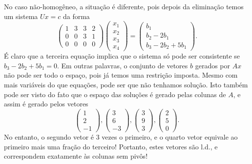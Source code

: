 No caso não-homogêneo, a situação é diferente, pois depois da eliminação temos um sistema $Ux=c$ da forma
\begin{equation*}
   \begin{pmatrix}
      1 & 3 & 3 & 2\\
      0 & 0 & 3 & 1\\
      0 & 0 & 0 & 0 
    \end{pmatrix}
    \begin{pmatrix}
      x_1\\
      x_2\\
      x_3\\
      x_4
    \end{pmatrix}
    =
    \begin{pmatrix}
      b_1\\
      b_2-2b_1\\
      b_3-2b_2+5b_1
    \end{pmatrix}.
\end{equation*}
É claro que a terceira equação implica que o sistema só pode ser consistente se $b_3-2b_2 +5b_1=0$. Em outras palavras, o conjunto de vetores $b$ gerados por $Ax$ não pode ser todo o espaço, pois já temos uma restrição imposta. Mesmo com mais variáveis do que equações, pode ser que não tenhamos solução. Isto também pode ser visto do fato que o espaço das soluções é gerado pelas colunas de $A$, e assim é gerado pelos vetores
\begin{equation*}
   \begin{pmatrix}
      1\\
      2\\
      -1
   \end{pmatrix}
   , 
   \begin{pmatrix}
      3\\
      6\\
      -3
   \end{pmatrix}
   ,
   \begin{pmatrix}
      3\\
      9\\
      3
   \end{pmatrix}
   ,
   \begin{pmatrix}
      2\\
      5\\
      0
   \end{pmatrix}.
\end{equation*}
No entanto, o segundo vetor é 3 vezes o primeiro, e o quarto vetor equivale ao primeiro mais uma fração do terceiro! Portanto, estes vetores são l.d., e correspondem exatamente às colunas sem pivôs!

